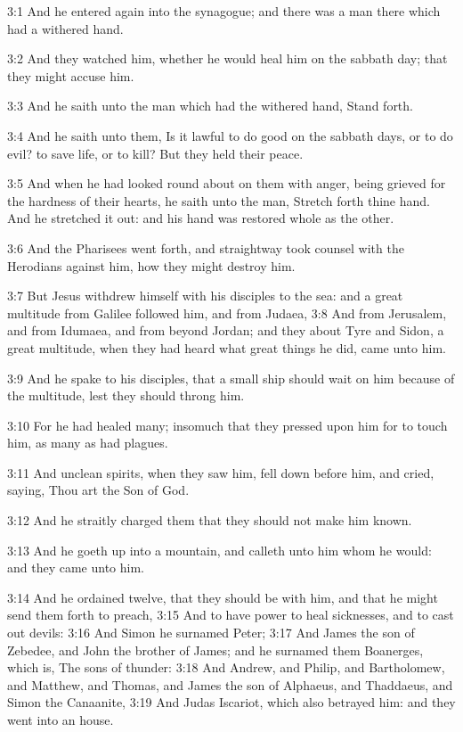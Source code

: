 3:1 And he entered again into the synagogue; and there was a man there
which had a withered hand.

3:2 And they watched him, whether he would heal him on the sabbath
day; that they might accuse him.

3:3 And he saith unto the man which had the withered hand, Stand
forth.

3:4 And he saith unto them, Is it lawful to do good on the sabbath
days, or to do evil? to save life, or to kill? But they held their
peace.

3:5 And when he had looked round about on them with anger, being
grieved for the hardness of their hearts, he saith unto the man,
Stretch forth thine hand. And he stretched it out: and his hand was
restored whole as the other.

3:6 And the Pharisees went forth, and straightway took counsel with
the Herodians against him, how they might destroy him.

3:7 But Jesus withdrew himself with his disciples to the sea: and a
great multitude from Galilee followed him, and from Judaea, 3:8 And
from Jerusalem, and from Idumaea, and from beyond Jordan; and they
about Tyre and Sidon, a great multitude, when they had heard what
great things he did, came unto him.

3:9 And he spake to his disciples, that a small ship should wait on
him because of the multitude, lest they should throng him.

3:10 For he had healed many; insomuch that they pressed upon him for
to touch him, as many as had plagues.

3:11 And unclean spirits, when they saw him, fell down before him, and
cried, saying, Thou art the Son of God.

3:12 And he straitly charged them that they should not make him known.

3:13 And he goeth up into a mountain, and calleth unto him whom he
would: and they came unto him.

3:14 And he ordained twelve, that they should be with him, and that he
might send them forth to preach, 3:15 And to have power to heal
sicknesses, and to cast out devils: 3:16 And Simon he surnamed Peter;
3:17 And James the son of Zebedee, and John the brother of James; and
he surnamed them Boanerges, which is, The sons of thunder: 3:18 And
Andrew, and Philip, and Bartholomew, and Matthew, and Thomas, and
James the son of Alphaeus, and Thaddaeus, and Simon the Canaanite,
3:19 And Judas Iscariot, which also betrayed him: and they went into
an house.

